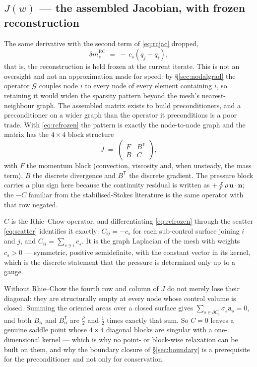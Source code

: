 \documentclass[11pt,a4paper]{article}
\newcommand{\bu}{\mathbf{u}}
\newcommand{\bn}{\mathbf{n}}
\newcommand{\ba}{\mathbf{a}}
\newcommand{\mdot}{\dot m}
\begin{document}
\subsection{$J(w)$ --- the assembled Jacobian, with frozen reconstruction}
\label{sec:jacassembled}

The same derivative with the second term of \eqref{eq:rcjac} dropped,
\begin{equation}
  \delta \mdot_s^{\mathrm{RC}} \;=\; -\,c_s \left( q_j - q_i \right) ,
  \label{eq:rcfrozen}
\end{equation}
that is, the reconstruction is held frozen at the current iterate. This is not an oversight
and not an approximation made for speed: by \S\ref{sec:nodalgrad} the operator $\mathcal{G}$
couples node $i$ to every node of every element containing $i$, so retaining it would widen
the sparsity pattern beyond the mesh's nearest-neighbour graph. The assembled matrix exists to
build preconditioners, and a preconditioner on a wider graph than the operator it
preconditions is a poor trade. With \eqref{eq:rcfrozen} the pattern is exactly the
node-to-node graph and the matrix has the $4\times4$ block structure
\begin{equation}
  J \;=\;
  \begin{pmatrix}
    F & B^{\mathsf T} \\
    B & C
  \end{pmatrix} ,
  \label{eq:blockform}
\end{equation}
with $F$ the momentum block (convection, viscosity and, when unsteady, the mass term), $B$ the
discrete divergence and $B^{\mathsf T}$ the discrete gradient. The pressure block carries a
plus sign here because the continuity residual is written as $+\oint \rho\,\bu\cdot\bn$; the
$-C$ familiar from the stabilised-Stokes literature is the same operator with that row
negated.

$C$ is the Rhie--Chow operator, and differentiating \eqref{eq:rcfrozen} through the scatter
\eqref{eq:scatter} identifies it exactly: $C_{ij} = -c_s$ for each sub-control surface joining
$i$ and $j$, and $C_{ii} = \sum_{s \ni i} c_s$. It is the graph Laplacian of the mesh with
weights $c_s > 0$ --- symmetric, positive semidefinite, with the constant vector in its
kernel, which is the discrete statement that the pressure is determined only up to a gauge.

Without Rhie--Chow the fourth row and column of $J$ do not merely lose their diagonal: they
are structurally empty at every node whose control volume is closed. Summing the oriented
areas over a closed surface gives $\sum_{s \in \partial C_i} \sigma_s \ba_s = 0$, and both
$B_{ii}$ and $B^{\mathsf T}_{ii}$ are $\tfrac{\rho}{2}$ and $\tfrac12$ times exactly that sum.
So $C = 0$ leaves a genuine saddle point whose $4\times4$ diagonal blocks are singular with a
one-dimensional kernel --- which is why no point- or block-wise relaxation can be built on
them, and why the boundary closure of \S\ref{sec:boundary} is a prerequisite for the
preconditioner and not only for conservation.
\end{document}
